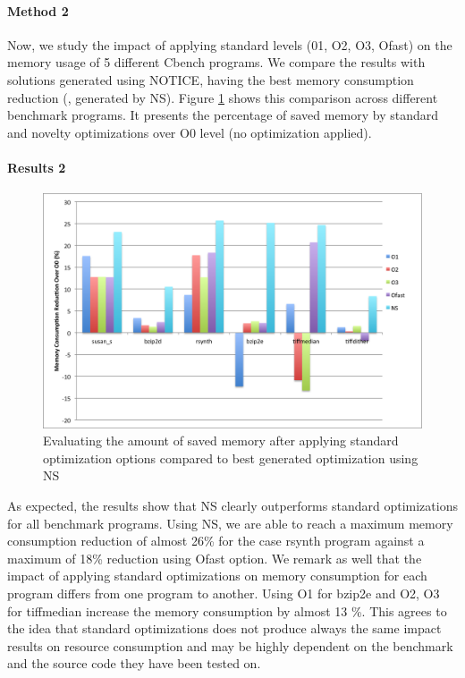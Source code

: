 \paragraph{Method 2}

Now, we study the impact of applying standard levels (01, O2, O3, Ofast) on the memory usage of 5 different Cbench programs. We compare the results with solutions generated using NOTICE, having the best memory consumption reduction (\ie, generated by NS). 
Figure \ref{fig:infra_novelty_stat3.pdf} shows this comparison across different benchmark programs. It presents the percentage of saved memory by standard and novelty optimizations over O0 level (no optimization applied).

\paragraph{Results 2}

\begin{figure}[!ht]
	\centering
	\includegraphics[width=0.9\linewidth]{chapitre4/fig/infra_novelty_stat3.png}
	\caption{Evaluating the amount of saved memory after applying standard optimization options compared to best generated optimization using NS}
	\label{fig:infra_novelty_stat3.pdf}
\end{figure}


As expected, the results show that NS clearly outperforms standard optimizations for all benchmark programs. Using NS, we are able to reach a maximum memory consumption reduction of almost 26\% for the case rsynth program against a maximum of 18\% reduction using Ofast option.
We remark as well that the impact of applying standard optimizations on memory consumption for each program differs from one program to another. 
Using O1 for bzip2e and O2, O3 for tiffmedian increase the memory consumption by almost 13 \%. 
This agrees to the idea that standard optimizations does not produce always the same impact results on resource consumption and may be highly dependent on the benchmark and the source code they have been tested on. 

